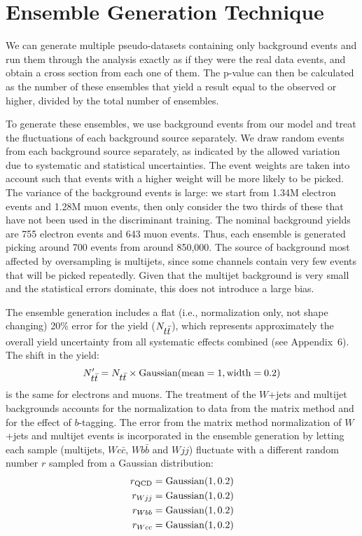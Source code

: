 \chapter{Ensemble Generation Technique}
\label{ensemblegeneration}

We can generate multiple pseudo-datasets containing only background
events and run them through the analysis exactly as if they were the
real data events, and obtain a cross section from each one of
them. The p-value can then be calculated as the number of these
ensembles that yield a result equal to the observed or higher, divided
by the total number of ensembles.

To generate these ensembles, we use background events from our model
and treat the fluctuations of each background source separately. We
draw random events from each background source separately, as
indicated by the allowed variation due to systematic and statistical
uncertainties. The event weights are taken into account such that
events with a higher weight will be more likely to be picked. The
variance of the background events is large: we start from 1.34M
electron events and 1.28M muon events, then only consider the two
thirds of these that have not been used in the discriminant
training. The nominal background yields are 755 electron events and
643 muon events. Thus, each ensemble is generated picking around 700
events from around 850,000. The source of background most affected by
oversampling is multijets, since some channels contain very few events
that will be picked repeatedly. Given that the multijet background is
very small and the statistical errors dominate, this does not
introduce a large bias.

The ensemble generation includes a flat (i.e., normalization only, not
shape changing) 20\% error for the {\ttbar} yield ($N_{\mbox{$t\bar{t}$}}$),
which represents approximately the overall yield uncertainty from all
systematic effects combined (see Appendix~6). The shift in the
{\ttbar} yield:
$$
N_{\mbox{$t\bar{t}$}}^{\prime}
= N_{\mbox{$t\bar{t}$}}\times {\rm Gaussian}({\rm mean=1},{\rm width=0.2})
$$
is the same for electrons and muons. The treatment of the $W$+jets and
multijet backgrounds accounts for the normalization to data from the
matrix method and for the effect of $b$-tagging. The error from the
matrix method normalization of $W$+jets and multijet events is
incorporated in the ensemble generation by letting each sample
(multijets, $Wc\bar{c}$, $Wb\bar{b}$ and $Wjj$) fluctuate with a
different random number $r$ sampled from a Gaussian distribution:
\begin{eqnarray*}
r_{\rm QCD} = {\rm Gaussian}(1,0.2) \\
r_{Wjj}     = {\rm Gaussian}(1,0.2) \\
r_{Wbb}     = {\rm Gaussian}(1,0.2) \\
r_{Wcc}     = {\rm Gaussian}(1,0.2) 
\end{eqnarray*}

